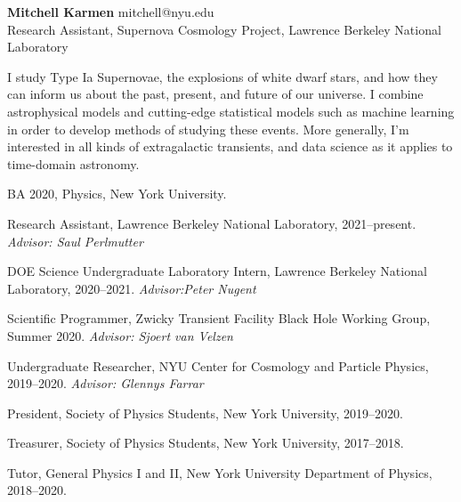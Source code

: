 \documentclass[12pt,letterpaper]{article}
\begin{document}
\thispagestyle{empty}\sloppy\sloppypar\raggedbottom

\textbf{\Large Mitchell Karmen} \hfill
\textsf{\small mitchell@nyu.edu} \\[0.5ex] %
Research Assistant, Supernova Cosmology Project, Lawrence Berkeley National Laboratory\\[0.5ex]

\medskip

I study Type Ia Supernovae, the explosions of white dwarf stars, and how they can inform us about the past, present, and future of our universe.  I combine astrophysical models and cutting-edge statistical models such as machine learning in order to develop methods of studying these events.  More generally, I'm interested in all kinds of extragalactic transients, and data science as it applies to time-domain astronomy.


\begin{list}{}{\cvlist}


  \item
        BA 2020, Physics, New York University.


\end{list}

\begin{list}{}{\cvlist}


  \item
        Research Assistant, Lawrence Berkeley National Laboratory, 2021--present. \textit{Advisor: Saul Perlmutter}

  \item
        DOE Science Undergraduate Laboratory Intern, Lawrence Berkeley National Laboratory, 2020--2021. \textit{Advisor:Peter Nugent}

  \item
        Scientific Programmer, Zwicky Transient Facility Black Hole Working Group, Summer 2020. \textit{Advisor: Sjoert van Velzen}
  \item
        Undergraduate Researcher, NYU Center for Cosmology and Particle Physics, 2019--2020. \textit{Advisor: Glennys Farrar}

\end{list}

\begin{list}{}{\cvlist}

\item
  President, Society of Physics Students, New York University, 2019--2020.

\item
  Treasurer, Society of Physics Students, New York University, 2017--2018.

\item
  Tutor, General Physics I and II, New York University Department of Physics, 2018--2020.


\end{list}
\end{document}
